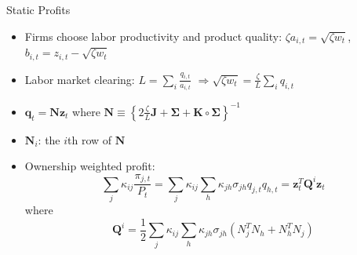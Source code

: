 \documentclass[
  10pt,
  aspectratio=169,   %
]{beamer}
\theoremstyle{plain}
\begin{document}
\begin{frame}{Static Profits}
  \label{Q}
  \begin{itemize}
    \item Firms choose labor productivity and product quality: $\zeta a_{i,t}=\sqrt{\zeta w_{t}}$, $b_{i,t}=z_{i,t}-\sqrt{\zeta w_{t}}$
    \item Labor market clearing: $L=\sum_{i}\frac{q_{i,t}}{a_{i,t}}$ $\Longrightarrow$$\sqrt{\zeta w_{t}}=\frac{\zeta}{L}\sum_{i}q_{i,t}$
    \item $\bm{q}_{t}=\bm{N}\bm{z}_{t}$ where $\bm{N}\equiv\left\{ 2\frac{\zeta}{L}\bm{J}+\bm{\Sigma}+\bm{K}\circ\bm{\Sigma}\right\} ^{-1}$
    \item $\bm{N}_{i}$: the $i$th row of $\bm{N}$
    \item Ownership weighted profit:
          {\small
          \[
            \sum_{j}\kappa_{ij}\frac{\pi_{j,t}}{P_{t}}=\sum_{j}\kappa_{ij}\sum_{h}\kappa_{jh}\sigma_{jh}q_{j,t}q_{h,t}=\bm{z}_{t}^{T}\bm{Q}^{i}\bm{z}_{t}
          \]}
          where
            {\small
              \[
                \bm{Q}^{i}=\frac{1}{2}\sum_{j}\kappa_{ij}\sum_{h}\kappa_{jh}\sigma_{jh}\left(N_{j}^{T}N_{h}+N_{h}^{T}N_{j}\right)
              \]}
          \hyperlink{dynamic_game}{}
  \end{itemize}
\end{frame}
\end{document}
